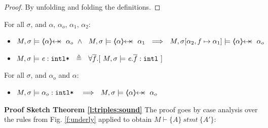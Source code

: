 \begin{proof}
By unfolding and folding the definitions.
\end{proof}

{
 \begin{lemma} For all $\sigma$,  and $\alpha$, $\alpha_o$, $\alpha_1$, $\alpha_2$:
 \label{l:prtFrom}
\begin{itemize}
\item
$ M, \sigma  \models    {\protectedFrom \alpha  {\alpha_o}}  \  \wedge \ \  M, \sigma  \models    {\protectedFrom \alpha  {\alpha_1}}    \   \ 
\Longrightarrow\ \ M, \sigma[\alpha_2,f \mapsto \alpha_1] \models  \protectedFrom\alpha   {\alpha_o}$
\end{itemize}
\end{lemma}
}

{
\begin{definition}
\begin{itemize}
\item
$M, \sigma \models \mathit{e}:\mbox{\normalfont{\texttt{intl*}}} \ \ \triangleq \ \ \forall \overline{f}.[\  M, \sigma \models \mathit{e}.\overline{f}:\mbox{\normalfont{\texttt{intl}}}\ ]$
\end{itemize}
\end{definition}
}

{
 \begin{lemma} For all $\sigma$, and $\alpha_o$ and $\alpha$:
\begin{itemize}
\item
$M, \sigma \models \internalPaths{\alpha_o}  \    \ \ \Longrightarrow\ \ M, \sigma \models {\protectedFrom \alpha {\alpha_o}}$
\end{itemize}
\end{lemma}
}

\noindent
\vspace{.2cm}
\textbf{Proof Sketch Theorem \ref{l:triples:sound}} 
The proof goes by case analysis over the rules from Fig. \ref{f:underly}  applied to obtain $M \vdash \{ A \}\ stmt \  \{ A' \} $:

